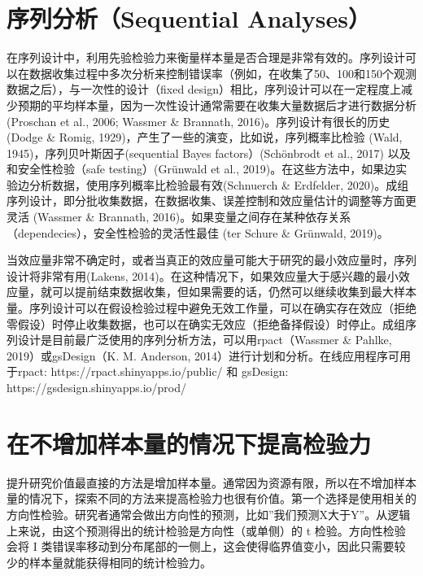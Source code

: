 \documentclass[
  letterpaper,
  DIV=11,
  numbers=noendperiod]{scrreprt}
\begin{document}
\hypertarget{sec-sequentialsamplesize}{%
\section{序列分析（Sequential
Analyses）}\label{sec-sequentialsamplesize}}

在序列设计中，利用先验检验力来衡量样本量是否合理是非常有效的。序列设计可以在数据收集过程中多次分析来控制错误率（例如，在收集了50、100和150个观测数据之后），与一次性的设计（fixed
design）相比，序列设计可以在一定程度上减少预期的平均样本量，因为一次性设计通常需要在收集大量数据后才进行数据分析(Proschan
et al., 2006; Wassmer \& Brannath, 2016)。序列设计有很长的历史(Dodge \&
Romig, 1929)，产生了一些的演变，比如说，序列概率比检验 (Wald,
1945)，序列贝叶斯因子(sequential Bayes factors）(Schönbrodt et al.,
2017) 以及和安全性检验（safe testing）(Grünwald et al.,
2019)。在这些方法中，如果边实验边分析数据，使用序列概率比检验最有效(Schnuerch
\& Erdfelder,
2020)。成组序列设计，即分批收集数据，在数据收集、误差控制和效应量估计的调整等方面更灵活
(Wassmer \& Brannath,
2016)。如果变量之间存在某种依存关系（dependecies），安全性检验的灵活性最佳
(ter Schure \& Grünwald, 2019)。

当效应量非常不确定时，或者当真正的效应量可能大于研究的最小效应量时，序列设计将非常有用(Lakens,
2014)。在这种情况下，如果效应量大于感兴趣的最小效应量，就可以提前结束数据收集，但如果需要的话，仍然可以继续收集到最大样本量。序列设计可以在假设检验过程中避免无效工作量，可以在确实存在效应（拒绝零假设）时停止收集数据，也可以在确实无效应（拒绝备择假设）时停止。成组序列设计是目前最广泛使用的序列分析方法，可以用rpact（Wassmer
\& Pahlke, 2019）或gsDesign（K. M. Anderson,
2014）进行计划和分析。在线应用程序可用于rpact:
https://rpact.shinyapps.io/public/ 和 gsDesign:
https://gsdesign.shinyapps.io/prod/

\hypertarget{ux5728ux4e0dux589eux52a0ux6837ux672cux91cfux7684ux60c5ux51b5ux4e0bux63d0ux9ad8ux68c0ux9a8cux529b}{%
\section{在不增加样本量的情况下提高检验力}\label{ux5728ux4e0dux589eux52a0ux6837ux672cux91cfux7684ux60c5ux51b5ux4e0bux63d0ux9ad8ux68c0ux9a8cux529b}}

提升研究价值最直接的方法是增加样本量。通常因为资源有限，所以在不增加样本量的情况下，探索不同的方法来提高检验力也很有价值。第一个选择是使用相关的方向性检验。研究者通常会做出方向性的预测，比如''我们预测X大于Y''。从逻辑上来说，由这个预测得出的统计检验是方向性（或单侧）的
t 检验。方向性检验会将 I
类错误率移动到分布尾部的一侧上，这会使得临界值变小，因此只需要较少的样本量就能获得相同的统计检验力。
\end{document}
